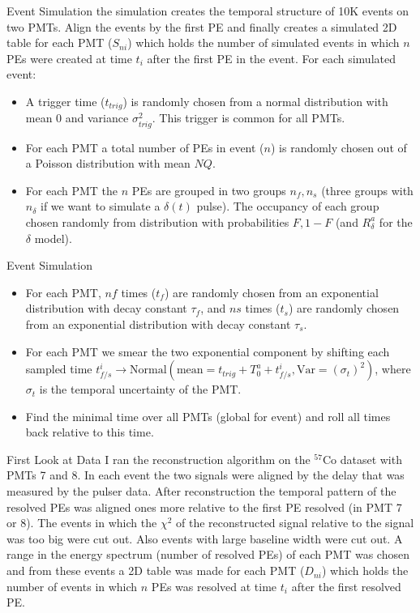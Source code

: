 \documentclass{beamer}
\begin{document}
\begin{frame}{Event Simulation}
the simulation creates the temporal structure of 10K events on two PMTs. Align the events by the first PE and finally creates a simulated 2D table for each PMT ($S_{ni}$) which holds the number of simulated events in which $n$ PEs were created at time $t_i$ after the first PE in the event. 
For each simulated event:
\begin{itemize}
\item A trigger time ($t_{trig}$) is randomly chosen from a normal distribution with mean 0 and variance $\sigma_{trig}^2$. This trigger is common for all PMTs.
\item For each PMT a total number of PEs in event ($n$) is randomly chosen out of a Poisson distribution with mean $NQ$.
\item For each PMT the $n$ PEs are grouped in two groups $n_f, n_s$ (three groups with $n_\delta$ if we want to simulate a $\delta(t)$ pulse). The occupancy of each group chosen randomly from distribution with probabilities $F, 1-F$ (and $R_\delta^a$ for the $\delta$ model). 
\end{itemize}
\end{frame}

\begin{frame}{Event Simulation}
\begin{itemize}
\item For each PMT, $nf$ times ($t_f$) are randomly chosen from an exponential distribution with decay constant $\tau_f$, and $ns$ times ($t_s$) are randomly chosen from an exponential distribution with decay constant $\tau_s$.
\item For each PMT we smear the two exponential component by shifting each sampled time $t_{f/s}^i\rightarrow \text{Normal}(\text{mean}=t_{trig}+T_0^a+t_{f/s}^i, \text{Var}=(\sigma_t)^2)$, where $\sigma_t$ is the temporal uncertainty of the PMT.
\item Find the minimal time over all PMTs (global for event) and roll all times back relative to this time.
\end{itemize}
\end{frame}

\begin{frame}{First Look at Data}
I ran the reconstruction algorithm on the $^{57}$Co dataset with PMTs 7 and 8. In each event the two signals were aligned by the delay that was measured by the pulser data. After reconstruction the temporal pattern of the resolved PEs was aligned ones more relative to the first PE resolved (in PMT 7 or 8). The events in which the $\chi^2$ of the reconstructed signal relative to the signal was too big were cut out. Also events with large baseline width were cut out. A range in the energy spectrum (number of resolved PEs) of each PMT was chosen and from these events a 2D table was made for each PMT ($D_{ni}$) which holds the number of events in which $n$ PEs was resolved at time $t_i$ after the first resolved PE.
\end{frame}
\end{document}
